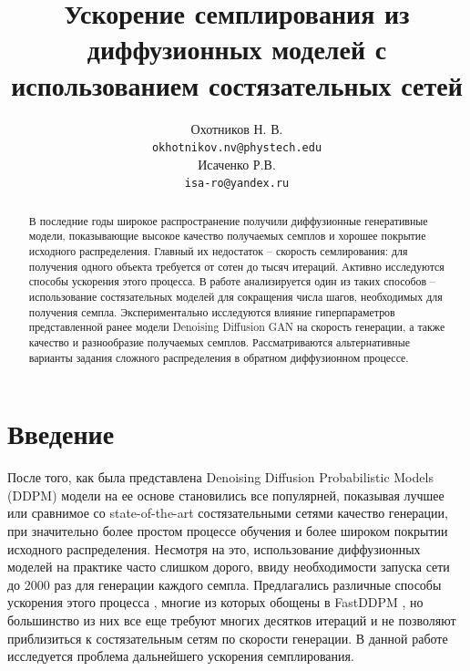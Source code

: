 \documentclass{article}
\title{Ускорение семплирования из диффузионных моделей с использованием состязательных сетей}
\author{Охотников Н. В.\\
	\texttt{okhotnikov.nv@phystech.edu} \\
	\And
    Исаченко Р.В. \\
	\texttt{isa-ro@yandex.ru} \\
}
\date{}
\begin{document}
\maketitle
\begin{abstract}
	В последние годы широкое распространение получили диффузионные генеративные модели, показывающие высокое качество получаемых семплов и хорошее покрытие исходного распределения. Главный их недостаток -- скорость семлирования: для получения одного объекта требуется от сотен до тысяч итераций. Активно исследуются способы ускорения этого процесса. В работе анализируется один из таких способов -- использование состязательных моделей для сокращения числа шагов, необходимых для получения семпла. Экспериментально исследуются влияние гиперпараметров представленной ранее модели Denoising Diffusion GAN \cite{https://doi.org/10.48550/arxiv.2112.07804} на скорость генерации, а также качество и разнообразие получаемых семплов. Рассматриваются альтернативные варианты задания сложного распределения в обратном диффузионном процессе.
\end{abstract}

\section{Введение}
 После того, как была представлена Denoising Diffusion Probabilistic Models (DDPM) \cite{https://doi.org/10.48550/arxiv.2006.11239} модели на ее основе становились все популярней, показывая лучшее или сравнимое со state-of-the-art состязательными сетями \cite{https://doi.org/10.48550/arxiv.1812.04948} качество генерации\cite{https://doi.org/10.48550/arxiv.2105.05233}, при значительно более простом процессе обучения и более широком покрытии исходного распределения. Несмотря на это, использование диффузионных моделей на практике часто слишком дорого, ввиду необходимости запуска сети до 2000 раз для генерации каждого семпла. Предлагались различные способы ускорения этого процесса \cite{https://doi.org/10.48550/arxiv.2102.09672}, многие из которых обощены в FastDDPM \cite{https://doi.org/10.48550/arxiv.2106.00132}, но большинство из них все еще требуют многих десятков итераций и не позволяют приблизиться к состязательным сетям по скорости генерации. В данной работе исследуется проблема дальнейшего ускорения семплирования.
 
\end{document}

